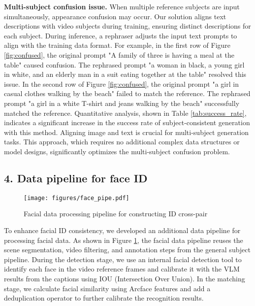 \textbf{Multi-subject confusion issue.} When multiple reference subjects are input simultaneously, appearance confusion may occur. Our solution aligns text descriptions with video subjects during training, ensuring distinct descriptions for each subject. During inference, a rephraser adjusts the input text prompts to align with the training data format. For example, in the first row of Figure \ref{fig:confused}, the original prompt "A family of three is having a meal at the table" caused confusion. The rephrased prompt "a woman in black, a young girl in white, and an elderly man in a suit eating together at the table" resolved this issue. In the second row of Figure \ref{fig:confused}, the original prompt "a girl in casual clothes walking by the beach" failed to match the reference. The rephrased prompt "a girl in a white T-shirt and jeans walking by the beach" successfully matched the reference.
Quantitative analysis, shown in Table \ref{tab:success_rate}, indicates a significant increase in the success rate of subject-consistent generation with this method.
Aligning image and text is crucial for multi-subject generation tasks. This approach, which requires no additional complex data structures or model designs, significantly optimizes the multi-subject confusion problem.


\subsection*{4. Data pipeline for face ID }
\label{sec:supp:facedata}

\begin{figure}[h]
	\centering
	\texttt{[image: figures/face\_pipe.pdf]} 
	\caption{Facial data processing pipeline for constructing ID cross-pair}
	\label{fig:facepipe}
\end{figure}

To enhance facial ID consistency, we developed an additional data pipeline for processing facial data. As shown in Figure \ref{fig:facepipe}, the facial data pipeline reuses the scene segmentation, video filtering, and annotation steps from the general subject pipeline. During the detection stage, we use an internal facial detection tool to identify each face in the video reference frames and calibrate it with the VLM \cite{Qwen2.5-VL} results from the captions using IOU (Intersection Over Union). In the matching stage, we calculate facial similarity using Arcface \cite{deng2019arcface} features and add a deduplication operator \cite{idealods2019imagededup} to further calibrate the recognition results.


